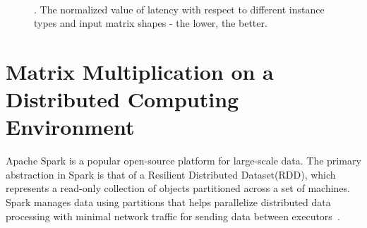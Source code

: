 \documentclass[10pt, conference, compsocconf]{IEEEtran}
\begin{document}
\begin{figure}[!ht]
  \centering
  \\
  \caption{\label{fig:instance-blocks-sizes-compare}. The normalized value of latency with respect to different instance types and input matrix shapes - the lower, the better.}
\end{figure}

\section{Matrix Multiplication on a Distributed Computing Environment}\label{sec:distributed-matrix-computation}

Apache Spark is a popular open-source platform for large-scale data. The primary abstraction in Spark is that of a Resilient Distributed Dataset(RDD), which represents a read-only collection of objects partitioned across a set of machines. Spark manages data using partitions that helps parallelize distributed data processing with minimal network traffic for sending data between executors~\cite{spark}. 
\end{document}
